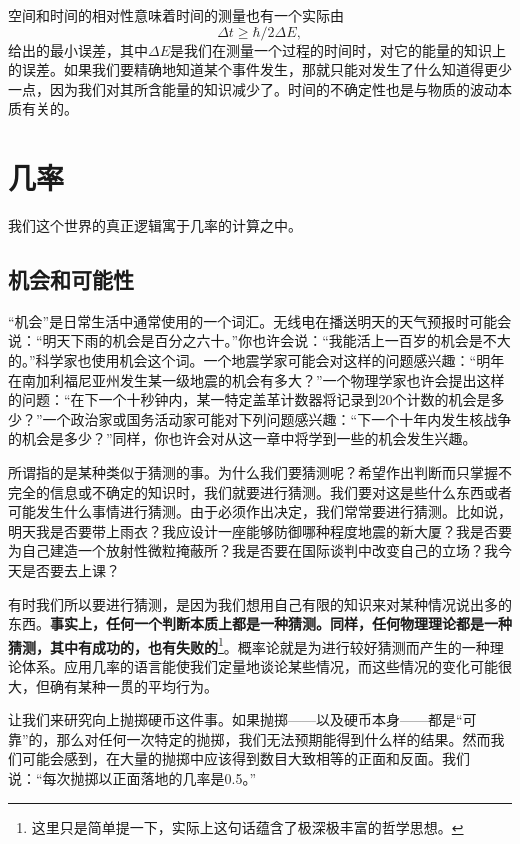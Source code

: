 \documentclass[12pt,oneside]{book}
\renewenvironment{quote}[1][anonymous]{
\newcommand{\quoteauthor}[1][anonymous]{#1}
\list{}{\rightmargin\leftmargin %
\itemindent   2em
}\item\relax
\ttfamily}
{\\
\makebox[\linewidth][r]{\sffamily —\quoteauthor}
\endlist}
\begin{document}
空间和时间的相对性意味着时间的测量也有一个实际由
\begin{equation*}
\Delta t\geq\hbar/2\Delta E,
\end{equation*}
给出的最小误差，其中$\Delta E$是我们在测量一个过程的时间时，对它的能量的知识上的误差。如果我们要精确地知道某个事件发生，那就只能对发生了什么知道得更少一点，因为我们对其所含能量的知识减少了。时间的不确定性也是与物质的波动本质有关的。



\chapter{几率}
\begin{quote}[J. C. 麦克斯韦]
我们这个世界的真正逻辑寓于几率的计算之中。
\end{quote}

\section{机会和可能性}
“机会”是日常生活中通常使用的一个词汇。无线电在播送明天的天气预报时可能会说：“明天下雨的机会是百分之六十。”你也许会说：“我能活上一百岁的机会是不大的。”科学家也使用机会这个词。一个地震学家可能会对这样的问题感兴趣：“明年在南加利福尼亚州发生某一级地震的机会有多大？”一个物理学家也许会提出这样的问题：“在下一个十秒钟内，某一特定盖革计数器将记录到20个计数的机会是多少？”一个政治家或国务活动家可能对下列问题感兴趣：“下一个十年内发生核战争的机会是多少？”同样，你也许会对从这一章中将学到一些的机会发生兴趣。

所谓指的是某种类似于猜测的事。为什么我们要猜测呢？希望作出判断而只掌握不完全的信息或不确定的知识时，我们就要进行猜测。我们要对这是些什么东西或者可能发生什么事情进行猜测。由于必须作出决定，我们常常要进行猜测。比如说，明天我是否要带上雨衣？我应设计一座能够防御哪种程度地震的新大厦？我是否要为自己建造一个放射性微粒掩蔽所？我是否要在国际谈判中改变自己的立场？我今天是否要去上课？

有时我们所以要进行猜测，是因为我们想用自己有限的知识来对某种情况说出多的东西。\textbf{事实上，任何一个判断本质上都是一种猜测。同样，任何物理理论都是一种猜测，其中有成功的，也有失败的}\footnote{这里只是简单提一下，实际上这句话蕴含了极深极丰富的哲学思想。}。概率论就是为进行较好猜测而产生的一种理论体系。应用几率的语言能使我们定量地谈论某些情况，而这些情况的变化可能很大，但确有某种一贯的平均行为。

让我们来研究向上抛掷硬币这件事。如果抛掷——以及硬币本身——都是“可靠”的，那么对任何一次特定的抛掷，我们无法预期能得到什么样的结果。然而我们可能会感到，在大量的抛掷中应该得到数目大致相等的正面和反面。我们说：“每次抛掷以正面落地的几率是0.5。”
\end{document}
